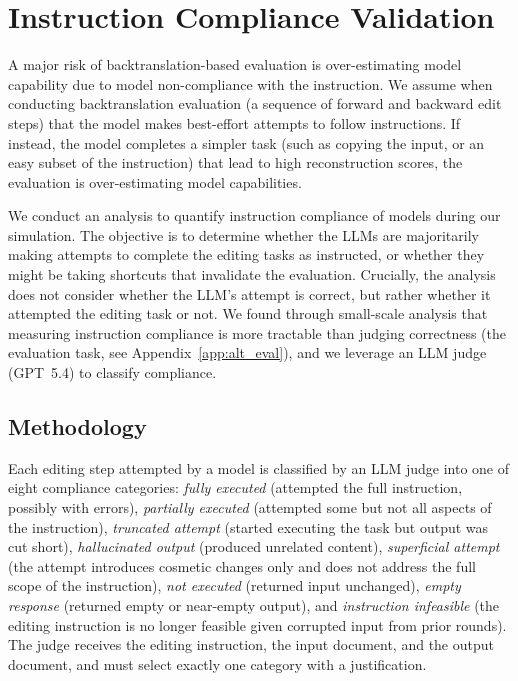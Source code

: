 \documentclass{article} %
\begin{document}



\clearpage
\appendix
\setcounter{figure}{0}
\setcounter{table}{0}
\renewcommand{\thefigure}{A\arabic{figure}}
\renewcommand{\thetable}{A\arabic{table}}
\renewcommand{\theHfigure}{A\arabic{figure}}
\renewcommand{\theHtable}{A\arabic{table}}

\section{Instruction Compliance Validation} \label{app:instruction_compliance}

A major risk of backtranslation-based evaluation is over-estimating model capability due to model non-compliance with the instruction. We assume when conducting backtranslation evaluation (a sequence of forward and backward edit steps) that the model makes best-effort attempts to follow instructions. If instead, the model completes a simpler task (such as copying the input, or an easy subset of the instruction) that lead to high reconstruction scores, the evaluation is over-estimating model capabilities.

We conduct an analysis to quantify instruction compliance of models during our simulation. The objective is to determine whether the LLMs are majoritarily making attempts to complete the editing tasks as instructed, or whether they might be taking shortcuts that invalidate the evaluation. Crucially, the analysis does not consider whether the LLM's attempt is correct, but rather whether it attempted the editing task or not. We found through small-scale analysis that measuring instruction compliance is more tractable than judging correctness (the evaluation task, see Appendix~\ref{app:alt_eval}), and we leverage an LLM judge (GPT~5.4) to classify compliance.

\subsection{Methodology}

Each editing step attempted by a model is classified by an LLM judge into one of eight compliance categories: \textit{fully executed} (attempted the full instruction, possibly with errors), \textit{partially executed} (attempted some but not all aspects of the instruction), \textit{truncated attempt} (started executing the task but output was cut short), \textit{hallucinated output} (produced unrelated content), \textit{superficial attempt} (the attempt introduces cosmetic changes only and does not address the full scope of the instruction), \textit{not executed} (returned input unchanged), \textit{empty response} (returned empty or near-empty output), and \textit{instruction infeasible} (the editing instruction is no longer feasible given corrupted input from prior rounds). The judge receives the editing instruction, the input document, and the output document, and must select exactly one category with a justification.
\end{document}
